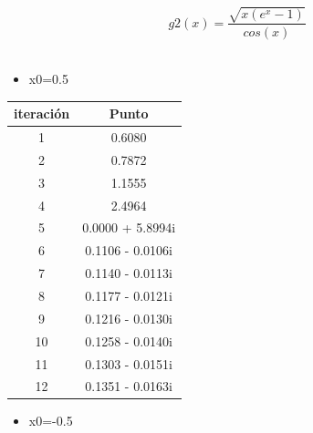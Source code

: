 \documentclass{udparticle}
\begin{document}
\begin{enumerate}
\begin{enumerate}
\begin{equation}
 g2(x) = \frac{\sqrt{x(e^x-1)}}
{cos(x)}
\end{equation}
\\
\begin{itemize}
\item x0=0.5
\end{itemize}

\begin{table}[H]
    \centering
        \begin{tabular} { |c|c|}
        
        \hline
        iteración  &  Punto\\
        \hline
        1 &  0.6080       \\
         \hline
        2 &   0.7872     \\
         \hline
        3 &  1.1555       \\
         \hline
        4 &   2.4964     \\
         \hline
        5 & 0.0000 + 5.8994i        \\
         \hline
        6 &  0.1106 - 0.0106i       \\
         \hline
        7 & 0.1140 - 0.0113i         \\
         \hline
        8 &    0.1177 - 0.0121i     \\
         \hline
        9 &     0.1216 - 0.0130i     \\
         \hline
        10 &   0.1258 - 0.0140i       \\
         \hline
        11 &    0.1303 - 0.0151i   \\
         \hline
        12 &  0.1351 - 0.0163i        \\
        \hline
        
        \end{tabular}
        
    \end{table}
    \begin{itemize}
\item x0=-0.5
\end{itemize}

\begin{table}[H]
    \centering
        \begin{tabular} { |c|c|}
        

\end{tabular}
\end{table}
\end{enumerate}
\end{enumerate}
\end{document}
